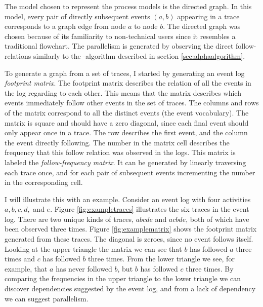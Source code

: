 The model chosen to represent the process models is the directed graph. 
In this model, every pair of directly subsequent events $(a,b)$ appearing in a trace corresponds to a 
graph edge from node $a$ to node $b$.
The directed graph was chosen because of its familiarity to non-technical users since it resembles a traditional flowchart.
The parallelism is generated by observing the direct follow-relations similarly to the \textalpha-algorithm described in section \ref{sec:alphaalgorithm}.

To generate a graph from a set of traces, I started by generating an event log \emph{footprint matrix}.
The footprint matrix describes the relation of all the events in the log regarding to each other.
This means that the matrix describes which events immediately follow other events in the set of traces.
The columns and rows of the matrix correspond to all the distinct events (the event vocabulary).
The matrix is square and should have a zero diagonal, since each final event should only appear once in a trace.
The row describes the first event, and the column the event directly following.
The number in the matrix cell describes the frequency that this follow relation was observed in the logs.
This matrix is labeled the \textit{follow-frequency matrix}.
It can be generated by linearly traversing each trace once, and for each pair of subsequent events incrementing the number in the corresponding cell.

I will illustrate this with an example. Consider an event log with four activities $a,b,c,d,$ and $e$.
Figure \ref{fig:exampletraces} illustrates the six traces in the event log. There are two unique kinds of traces, $abcde$ and $acbde$, both of which have been observed three times. Figure \ref{fig:examplematrix} shows the footprint matrix generated from these traces.
The diagonal is zeroes, since no event follows itself.
Looking at the upper triangle the matrix we can see that $b$ has followed $a$ three times and $c$ has followed $b$ three times. From the lower triangle we see, for example, that $a$ has never followed $b$, but $b$ has followed $c$ three times.
By comparing the frequencies in the upper triangle to the lower triangle we can discover dependencies suggested by the event log, and from a lack of dependency we can suggest parallelism.

